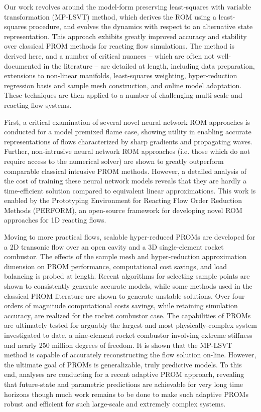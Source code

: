 Our work revolves around the model-form preserving least-squares with variable transformation (MP-LSVT) method, which derives the ROM using a least-squares procedure, and evolves the dynamics with respect to an alternative state representation. This approach exhibits greatly improved accuracy and stability over classical PROM methods for reacting flow simulations. The method is derived here, and a number of critical nuances -- which are often not well-documented in the literature -- are detailed at length, including data preparation, extensions to non-linear manifolds, least-squares weighting, hyper-reduction regression basis and sample mesh construction, and online model adaptation. These techniques are then applied to a number of challenging multi-scale and reacting flow systems.

First, a critical examination of several novel neural network ROM approaches is conducted for a model premixed flame case, showing  utility in enabling  accurate representations of flows characterized by sharp gradients and propagating waves. Further, non-intrusive neural network ROM approaches (i.e. those which do not require access to the numerical solver) are shown to greatly outperform comparable classical intrusive PROM methods. However, a detailed analysis of the cost of training these neural network models reveals that they are hardly a time-efficient solution compared to equivalent linear approximations. This work is enabled by the Prototyping Environment for Reacting Flow Order Reduction Methods (PERFORM), an open-source framework for developing novel ROM approaches for 1D reacting flows.

Moving to more practical flows, scalable hyper-reduced PROMs are developed for a 2D transonic flow over an open cavity and a 3D single-element rocket combustor. The effects of the sample mesh and hyper-reduction approximation dimension on PROM performance, computational cost savings, and load balancing is probed at length. Recent algorithms for selecting sample points are shown to consistently generate accurate models, while some methods used in the classical PROM literature are shown to generate unstable solutions. Over four orders of magnitude computational costs savings, while retaining simulation accuracy, are realized for the rocket combustor case. The capabilities of PROMs are ultimately tested for arguably the largest and most physically-complex system investigated to date, a nine-element rocket combustor involving extreme stiffness and nearly 250 million degrees of freedom. It is shown that the MP-LSVT method is capable of accurately reconstructing the flow solution on-line. However, the ultimate goal of PROMs is generalizable, truly predictive models. To this end, analyses are conducting for a recent adaptive PROM approach, revealing that future-state and parametric predictions are achievable for very long time horizons though much work remains to be done to make such adaptive PROMs robust and efficient for such large-scale and extremely complex systems.

